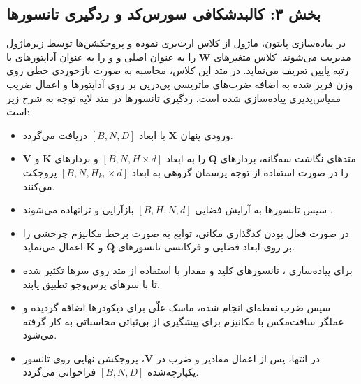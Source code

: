 \subsection*{بخش ۳: کالبدشکافی سورس‌کد و ردگیری تانسورها }
در پیاده‌سازی پایتون، ماژول  از کلاس  ارث‌بری نموده و پروجکشن‌ها توسط زیرماژول  مدیریت می‌شوند. کلاس  متغیرهای $\mathbf{W}$ را به عنوان  اصلی و  و  را به عنوان آداپتورهای با رتبه پایین تعریف می‌نماید. در متد  این کلاس، محاسبه به صورت بازخوردی خطی روی وزن فریز شده به اضافه ضرب‌های ماتریسی پی‌در‌پی بر روی آداپتورها و اعمال ضریب مقیاس‌پذیری  پیاده‌سازی شده است.
ردگیری تانسورها در متد  لایه توجه به شرح زیر است:
\begin{itemize}
    \item ورودی پنهان $\mathbf{X}$ با ابعاد $[B, N, D]$ دریافت می‌گردد.
    \item متدهای نگاشت سه‌گانه، بردارهای $\mathbf{Q}$ را به ابعاد $[B, N, H \times d]$ و بردارهای $\mathbf{K}$ و $\mathbf{V}$ را در صورت استفاده از توجه پرسمان گروهی  به ابعاد $[B, N, H_{kv} \times d]$ پروجکت می‌کنند.
    \item سپس تانسورها به آرایش فضایی $[B, H, N, d]$ بازآرایی و ترانهاده می‌شوند .
    \item در صورت فعال بودن کدگذاری مکانی، توابع  به صورت برخط مکانیزم چرخشی  را بر روی ابعاد فضایی و فرکانسی تانسورهای $\mathbf{Q}$ و $\mathbf{K}$ اعمال می‌نماید.
    \item برای پیاده‌سازی ، تانسورهای کلید و مقدار با استفاده از متد  روی سرها تکثیر شده تا با سرهای پرس‌وجو تطبیق یابند.
    \item سپس ضرب نقطه‌ای انجام شده، ماسک علّی  برای دیکودرها اضافه گردیده و عملگر سافت‌مکس با مکانیزم  برای پیشگیری از بی‌ثباتی محاسباتی به کار گرفته می‌شود.
    \item در انتها، پس از اعمال مقادیر  و ضرب در $\mathbf{V}$، پروجکشن نهایی  روی تانسور یکپارچه‌شده $[B, N, D]$ فراخوانی می‌گردد.
\end{itemize}

